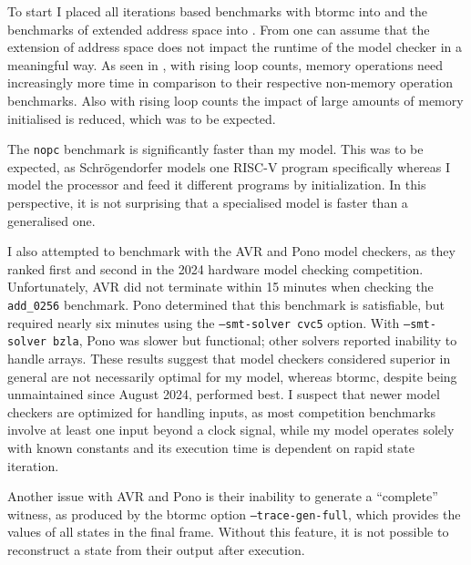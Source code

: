 To start I placed all iterations based benchmarks with btormc into
 and the benchmarks of extended address space
into . From  one
can assume that the extension of address space does not impact the
runtime of the model checker in a meaningful way. As seen in
, with rising loop counts, memory operations
need increasingly more time in comparison to their respective
non-memory operation benchmarks. Also with rising loop counts the
impact of large amounts of memory initialised is reduced, which was
to be expected.

The \texttt{nopc} benchmark is significantly faster than my model.
This was to be expected, as Schrögendorfer models one RISC-V program
specifically whereas I model the processor and feed it different
programs by initialization. In this perspective, it is not surprising
that a specialised model is faster than a generalised one. 




I also attempted to benchmark with the AVR and Pono model checkers,
as they ranked first and second in the 2024 hardware model checking
competition. Unfortunately, AVR did not terminate within 15 minutes
when checking the \texttt{add\_0256} benchmark. Pono determined that
this benchmark is satisfiable, but required nearly six minutes using
the \texttt{--smt-solver cvc5} option. With \texttt{--smt-solver
        bzla}, Pono was slower but functional; other solvers reported
inability to handle arrays. These results suggest that model checkers
considered superior in general are not necessarily optimal for my
model, whereas btormc, despite being unmaintained since August 2024,
performed best. I suspect that newer model checkers are optimized for
handling inputs, as most competition benchmarks involve at least one
input beyond a clock signal, while my model operates solely with
known constants and its execution time is dependent on rapid state
iteration.

Another issue with AVR and Pono is their inability to generate a
\enquote{complete} witness, as produced by the btormc option
\texttt{--trace-gen-full}, which provides the values of all states in
the final frame. Without this feature, it is not possible to
reconstruct a state from their output after execution.

%